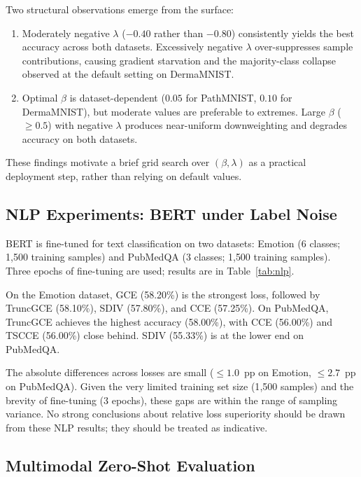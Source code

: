 Two structural observations emerge from the surface:
\begin{enumerate}[leftmargin=*,itemsep=2pt]
  \item Moderately negative $\lambda$ ($-0.40$ rather than $-0.80$)
        consistently yields the best accuracy across both datasets.
        Excessively negative $\lambda$ over-suppresses sample contributions,
        causing gradient starvation and the majority-class collapse observed
        at the default setting on DermaMNIST.
  \item Optimal $\beta$ is dataset-dependent ($0.05$ for PathMNIST,
        $0.10$ for DermaMNIST), but moderate values are preferable to
        extremes.
        Large $\beta$ ($\geq0.5$) with negative $\lambda$ produces near-uniform
        downweighting and degrades accuracy on both datasets.
\end{enumerate}
These findings motivate a brief grid search over $(\beta, \lambda)$ as
a practical deployment step, rather than relying on default values.

\subsection{NLP Experiments: BERT under Label Noise}
\label{sec:nlp}

BERT is fine-tuned for text classification on two datasets:
Emotion (6 classes; 1{,}500 training samples)
and PubMedQA (3 classes; 1{,}500 training samples).
Three epochs of fine-tuning are used; results are in Table~\ref{tab:nlp}.

On the Emotion dataset, GCE (58.20\%) is the strongest loss, followed by
TruncGCE (58.10\%), SDIV (57.80\%), and CCE (57.25\%).
On PubMedQA, TruncGCE achieves the highest accuracy (58.00\%), with
CCE (56.00\%) and TSCCE (56.00\%) close behind.
SDIV (55.33\%) is at the lower end on PubMedQA.

The absolute differences across losses are small ($\leq 1.0$~pp on Emotion,
$\leq 2.7$~pp on PubMedQA).
Given the very limited training set size (1{,}500 samples) and the brevity
of fine-tuning (3 epochs), these gaps are within the range of sampling
variance.
No strong conclusions about relative loss superiority should be drawn from
these NLP results; they should be treated as indicative.

\subsection{Multimodal Zero-Shot Evaluation}
\label{sec:multimodal}


